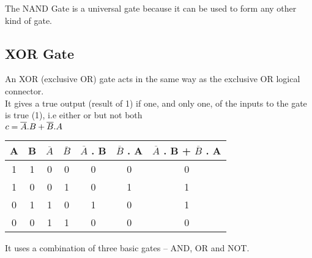 \documentclass{article}
\begin{document}
\color{red}The NAND Gate is a universal gate because it can be used to form any other kind of gate. \\ \color{black}

\subsection{XOR Gate}
An XOR (exclusive OR) gate acts in the same way as the exclusive OR logical connector. \\
It gives a true output (result of 1) if one, and only one, of the inputs to the gate is true (1), i.e either or but not both \\
\color{red}$\\ c = \overline{A}.B + \overline{B}.A$ \\ \color{black}

\begin{table}[h!]
	\begin{center}
		\begin{tabular}{c|c|c|c|c|c|c}
			\textbf{A} & \textbf{B} & \textbf{$\overline{A}$} & \textbf{$\overline{B}$} & \textbf{$\overline{A}$ . B} & \textbf{$\overline{B}$ . A} & \textbf{$\overline{A}$ . B} + \textbf{$\overline{B}$ . A}\\
			\hline
			1 & 1 & 0 & 0 & 0 & 0 & 0\\
			\hline
			1 & 0 & 0 & 1 & 0 & 1 & 1\\
			\hline
			0 & 1 & 1 & 0 & 1 & 0 & 1\\
			\hline
			0 & 0 & 1 & 1 & 0 & 0 & 0\\
			\hline
		\end{tabular}
	\end{center}
\end{table} 
\color{red}It uses a combination of three basic gates – AND, OR and NOT. \\ \color{black}
\end{document}
